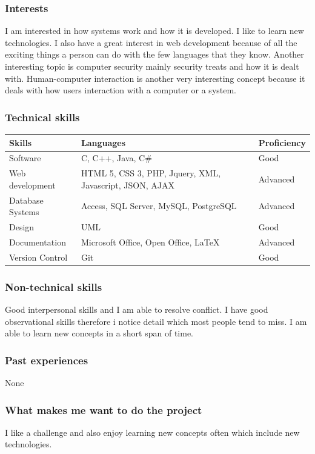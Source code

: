 \documentclass[a4paper,10pt]{article}
\begin{document}
\subsubsection*{Interests}
I am interested in how systems work and how it is developed. I like to learn new technologies. I also have a great interest in web development because of all the exciting things a person can do with the few languages that they know. Another interesting topic is computer security mainly security treats and how it is dealt with. Human-computer interaction is another very interesting concept because it deals with how users interaction with a computer or a system. 

\subsubsection*{Technical skills}
\begin{tabular}{|l|l|l|}
\hline
Skills&Languages&Proficiency\\ 
\hline
Software&C, C++, Java, C\#&Good\\
Web development&HTML 5, CSS 3, PHP, Jquery, XML, Javascript, JSON, AJAX&Advanced\\
Database Systems&Access, SQL Server, MySQL, PostgreSQL&Advanced\\
Design&UML&Good\\
Documentation&Microsoft Office, Open Office, LaTeX&Advanced\\
Version Control&Git&Good\\
\hline
\end{tabular}

\subsubsection*{Non-technical skills}
Good interpersonal skills and I am able to resolve conflict. I have good observational skills therefore i notice detail which most people tend to miss. I am able to learn new concepts in a short span of time.

\subsubsection*{Past experiences}
None

\subsubsection*{What makes me want to do the project}
I like a challenge and also enjoy learning new concepts often which include new technologies. 
\end{document}
